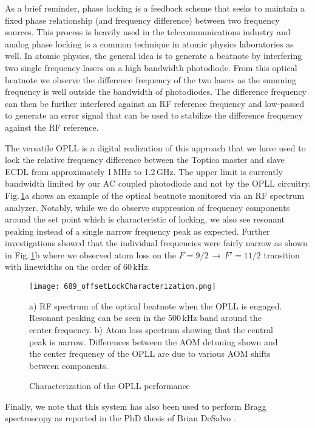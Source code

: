 As a brief reminder, phase locking is a feedback scheme that seeks to maintain a fixed phase relationship (and frequency difference) between two frequency sources.
This process is heavily used in the telecommunications industry and analog phase locking is a common technique in atomic physics laboratories as well.
In atomic physics, the general idea is to generate a beatnote by interfering two single frequency lasers on a high bandwidth photodiode.
From this optical beatnote we observe the difference frequency of the two lasers as the summing frequency is well outside the bandwidth of photodiodes.
The difference frequency can then be further interfered against an RF reference frequency and low-passed to generate an error signal that can be used to stabilize the difference frequency against the RF reference.

The versatile OPLL is a digital realization of this approach that we have used to lock the relative frequency difference between the Toptica master and slave ECDL from approximately 1\,MHz to 1.2\,GHz.
The upper limit is currently bandwidth limited by our AC coupled photodiode and not by the OPLL circuitry.
Fig.\,\ref{fig:offsetDetails}a shows an example of the optical beatnote monitored via an RF spectrum analyzer.
Notably, while we do observe suppression of frequency components around the set point which is characteristic of locking, we also see resonant peaking instead of a single narrow frequency peak as expected.
Further investigations showed that the individual frequencies were fairly narrow as shown in Fig.\,\ref{fig:offsetDetails}b where we observed atom loss on the $F=9/2\,\rightarrow\,F'=11/2$ transition with linewidths on the order of 60\,kHz.
	\begin{figure}
	\centerline{
		\texttt{[image: 689\_offsetLockCharacterization.png]}}
		\caption{Characterization of the OPLL performance}{a) RF spectrum of the optical beatnote when the OPLL is engaged. Resonant peaking can be seen in the 500\,kHz band around the center frequency. b) Atom loss spectrum showing that the central peak is narrow. Differences between the AOM detuning shown and the center frequency of the OPLL are due to various AOM shifts between components.}
		 \label{fig:offsetDetails}
	\end{figure}

Finally, we note that this system has also been used to perform Bragg spectroscopy as reported in the PhD thesis of Brian DeSalvo \cite{DeSalvo2015Thesis}.


